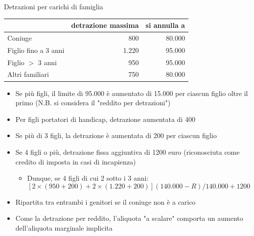 \documentclass[11pt]{beamer}
\newcommand\€{\,\text{€}}
\begin{document}
\begin{frame}{Detrazioni per carichi di famiglia}
\begin{center}
\begin{tabular}{lrr}
 & detrazione massima & si annulla a\\[0pt]
\hline
Coniuge & 800 & 80.000\\[0pt]
Figlio fino a 3 anni & 1.220 & 95.000\\[0pt]
Figlio $>$ 3 anni & 950 & 95.000\\[0pt]
Altri familiari & 750 & 80.000\\[0pt]
\end{tabular}
\end{center}

\begin{itemize}
\item Se più figli, il limite di 95.000 è aumentato di 15.000 per ciascun figlio
oltre il primo (N.B. si considera il "reddito per detrazioni")
\item Per figli portatori di handicap, detrazione aumentata di 400
\item Se più di 3 figli, la detrazione è aumentata di 200 per ciascun figlio
\item Se 4 figli o più, detrazione fissa aggiuntiva di 1200 euro (riconosciuta
come credito di imposta in casi di incapienza)
\begin{itemize}
\item Dunque, se 4 figli di cui 2 sotto i 3 anni:
$$ [2\times(950+200)+2\times(1.220+200)](140.000-R)/140.000+1200 $$
\end{itemize}
\item Ripartita tra entrambi i genitori se il coniuge non è a carico
\item Come la detrazione per reddito, l'aliquota "a scalare" comporta un aumento
dell'aliquota marginale implicita
\end{itemize}
\end{frame}
\end{document}
